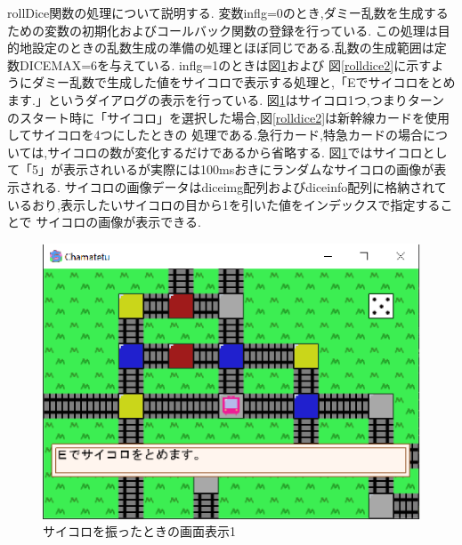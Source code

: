 \documentclass[a4j]{jarticle}
\begin{document}
        rollDice関数の処理について説明する. 変数inflg=0のとき,ダミー乱数を生成するための変数の初期化およびコールバック関数の登録を行っている.
        この処理は目的地設定のときの乱数生成の準備の処理とほぼ同じである.乱数の生成範囲は定数DICEMAX=6を与えている. inflg=1のときは図\ref{rolldice1}および
        図\ref{rolldice2}に示すようにダミー乱数で生成した値をサイコロで表示する処理と,「Eでサイコロをとめます.」というダイアログの表示を行っている.
        図\ref{rolldice1}はサイコロ1つ,つまりターンのスタート時に「サイコロ」を選択した場合,図\ref{rolldice2}は新幹線カードを使用してサイコロを4つにしたときの
        処理である.急行カード,特急カードの場合については,サイコロの数が変化するだけであるから省略する.
        図\ref{rolldice1}ではサイコロとして「5」が表示されいるが実際には100msおきにランダムなサイコロの画像が表示される.
        サイコロの画像データはdiceimg配列およびdiceinfo配列に格納されているおり,表示したいサイコロの目から1を引いた値をインデックスで指定することで
        サイコロの画像が表示できる.

        \begin{figure}[H]
            \centering
            \includegraphics[scale=1.3]{stopdice.eps}
            \caption{サイコロを振ったときの画面表示1}
             \label{rolldice1}
            \end{figure}   
\end{document}
